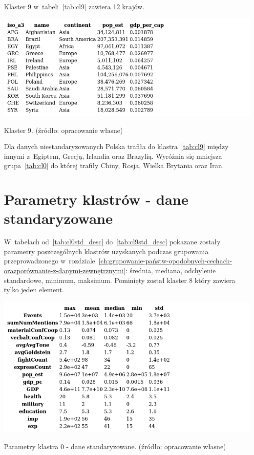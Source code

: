 \documentclass[11pt]{report}
\begin{document}
    Klaster 9 w~tabeli~\ref{tab:cl9} zawiera 12 krajów.
    \begin{table}[!htp]
        \centering
        \includegraphics[width=\linewidth]{tables/CLUST/clust9kmeans.png}
        \caption{Klaster 9. (źródło: opracowanie własne)}
        \label{tab:cl9}
    \end{table}

    Dla danych niestandaryzowanych Polska trafiła do klastra~\ref{tab:cl9} między innymi z~Egiptem, Grecją, Irlandia oraz Brazylią.
    Wyróżnia się mniejsza grupa~\ref{tab:cl0} do której trafiły Chiny, Rosja, Wielka Brytania oraz Iran.


    \chapter{Parametry klastrów - dane standaryzowane}\label{ch:parametry-klastrów---dane-standaryzowane}
    W~tabelach od~\ref{tab:cl0std_desc} do~\ref{tab:cl9std_desc} pokazane zostały parametry poszczególnych klastrów uzyskanych podczas grupowania przeprowadzonego w~rozdziale~\ref{ch:grupowanie-państw-opodobnych-cechach-orazporównanie-z-danymi-zewnętrznymi}: średnia, mediana, odchylenie standardowe, minimum, maksimum.
    Pominięty został klaster 8 który zawiera tylko jeden element.

    \begin{table}[!htp]
        \centering
        \includegraphics[width=\linewidth]{tables/CLUST/desc/clust0std_desc.png}
        \caption{Parametry klastra 0 - dane standaryzowane. (źródło: opracowanie własne)}
        \label{tab:cl0std_desc}
    \end{table}
\end{document}
